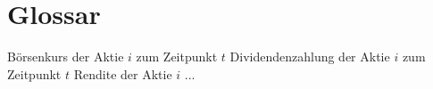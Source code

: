 \chapter{Glossar}

    {Börsenkurs der Aktie $i$ zum Zeitpunkt $t$}
	    {Dividendenzahlung der Aktie $i$ zum Zeitpunkt $t$}
         {Rendite der Aktie $i$}
      		    {...}

